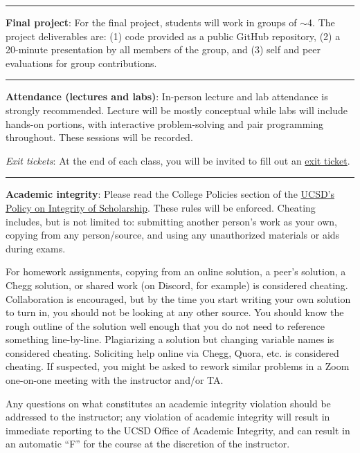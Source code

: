 \documentclass[12pt]{article}
\begin{document}
\begin{center}
  \rule{\textwidth}{0.5pt}
\end{center}

\noindent\textbf{Final project}:
For the final project, students will work in groups of $\sim$4.
The project deliverables are: (1) code provided as a public GitHub repository, (2) a 20-minute presentation by all members of the group, and (3) self and peer evaluations for group contributions.

\begin{center}
  \rule{\textwidth}{0.5pt}
\end{center}

\noindent\textbf{Attendance (lectures and labs)}: In-person lecture and lab attendance is strongly recommended.
Lecture will be mostly conceptual while labs will include hands-on portions, with interactive problem-solving and pair programming throughout.
These sessions will be recorded.

\emph{Exit tickets}: At the end of each class, you will be invited to fill out an \href{https://forms.gle/opY7EFZJiRBgkMsAA}{exit ticket}.

\begin{center}
  \rule{\textwidth}{0.5pt}
\end{center}

\noindent\textbf{Academic integrity}: Please read the College Policies section of the \href{http://senate.ucsd.edu/Operating-Procedures/Senate-Manual/Appendices/2}{UCSD's Policy on Integrity of Scholarship}.
These rules will be enforced.
Cheating includes, but is not limited to: submitting another person's work as your own, copying from any person/source, and using any unauthorized materials or aids during exams.

For homework assignments, copying from an online solution, a peer's solution, a Chegg solution, or shared work (on Discord, for example) is considered cheating.
Collaboration is encouraged, but by the time you start writing your own solution to turn in, you should not be looking at any other source.
You should know the rough outline of the solution well enough that you do not need to reference something line-by-line.
Plagiarizing a solution but changing variable names is considered cheating.
Soliciting help online via Chegg, Quora, etc. is considered cheating.
If suspected, you might be asked to rework similar problems in a Zoom one-on-one meeting with the instructor and/or TA.

Any questions on what constitutes an academic integrity violation should be addressed to the instructor; any violation of academic integrity will result in immediate reporting to the UCSD Office of Academic Integrity, and can result in an automatic ``F'' for the course at the discretion of the instructor.
\end{document}
